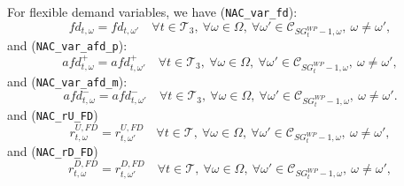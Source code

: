 \documentclass{article}
\begin{document}

For flexible demand variables, we have (\verb|NAC_var_fd|):
\begin{equation} \label{EQ:NAC_var_fd}
	fd_{t, \omega} = fd_{t, \omega'} \quad \forall t \in \mathcal{T}_3, \ \forall \omega \in \Omega,\ 
	\forall \omega' \in \mathcal{C}_{SG^{WP}_t - 1, \omega},\ \omega \neq \omega',
\end{equation}
and (\verb|NAC_var_afd_p|):
\begin{equation} \label{EQ:NAC_var_afd_p}
	afd^+_{t, \omega} = afd^+_{t, \omega'} \quad \forall t \in \mathcal{T}_3, \ \forall \omega \in \Omega,\
	\forall \omega' \in \mathcal{C}_{SG^{WP}_t - 1, \omega},\ \omega \neq \omega',
\end{equation}
and (\verb|NAC_var_afd_m|):
\begin{equation} \label{EQ:NAC_var_afd_m}
	afd^-_{t, \omega} = afd^-_{t, \omega'} \quad \forall t \in \mathcal{T}_3, \ \forall \omega \in \Omega,\
	\forall \omega' \in \mathcal{C}_{SG^{WP}_t - 1, \omega},\ \omega \neq \omega'.
\end{equation}
and (\verb|NAC_rU_FD|)
\begin{equation} \label{EQ:NAC_rUFD}
	r^{U,FD}_{t, \omega} = r^{U,FD}_{t, \omega'} \quad \forall t \in \mathcal{T},\ \forall \omega \in \Omega,\ \forall \omega' \in \mathcal{C}_{SG^{WP}_t - 1, \omega},\ \omega \neq \omega',
\end{equation}
and (\verb|NAC_rD_FD|)
\begin{equation} \label{EQ:NAC_rDFD}
	r^{D,FD}_{t, \omega} = r^{D,FD}_{t, \omega'} \quad \forall t \in \mathcal{T},\ \forall \omega \in \Omega,\ \forall \omega' \in \mathcal{C}_{SG^{WP}_t - 1, \omega},\ \omega \neq \omega',
\end{equation}
\end{document}
